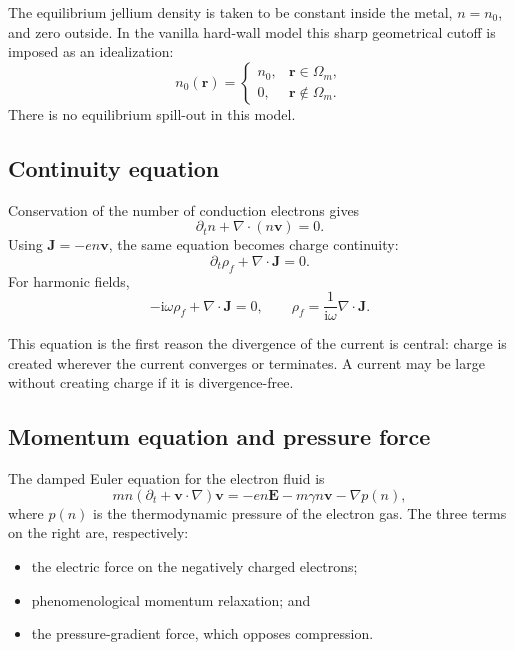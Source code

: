 \documentclass[11pt,a4paper]{article}
\newcommand{\E}{\mathbf E}
\newcommand{\J}{\mathbf J}
\newcommand{\ii}{\mathrm i}
\begin{document}
The equilibrium jellium density is taken to be constant inside the metal,
\(n=n_0\), and zero outside.  In the vanilla hard-wall model this sharp
geometrical cutoff is imposed as an idealization:
\begin{equation}
    n_0(\mathbf r)=
    \begin{cases}
       n_0, & \mathbf r\in\Omega_m,\\
       0, & \mathbf r\notin\Omega_m.
    \end{cases}
    \label{eq:sharp-equilibrium-density}
\end{equation}
There is no equilibrium spill-out in this model.

\subsection{Continuity equation}

Conservation of the number of conduction electrons gives
\begin{equation}
    \partial_t n+\nabla\!\cdot(n\mathbf v)=0.
    \label{eq:continuity-n}
\end{equation}
Using \(\J=-en\mathbf v\), the same equation becomes charge continuity:
\begin{equation}
    \partial_t\rho_f+\nabla\!\cdot\!\J=0.
    \label{eq:continuity-rho}
\end{equation}
For harmonic fields,
\begin{equation}
    -\ii\omega\rho_f+\nabla\!\cdot\!\J=0,
    \qquad
    \rho_f=\frac{1}{\ii\omega}\nabla\!\cdot\!\J.
    \label{eq:rho-from-J}
\end{equation}

This equation is the first reason the divergence of the current is central:
charge is created wherever the current converges or terminates.  A current
may be large without creating charge if it is divergence-free.

\subsection{Momentum equation and pressure force}

The damped Euler equation for the electron fluid is
\begin{equation}
    m n\left(\partial_t+\mathbf v\!\cdot\!\nabla\right)\mathbf v
    =-en\E-m\gamma n\mathbf v-\nabla p(n),
    \label{eq:euler-full}
\end{equation}
where \(p(n)\) is the thermodynamic pressure of the electron gas.  The three
terms on the right are, respectively:
\begin{itemize}
    \item the electric force on the negatively charged electrons;
    \item phenomenological momentum relaxation; and
    \item the pressure-gradient force, which opposes compression.
\end{itemize}
\end{document}
